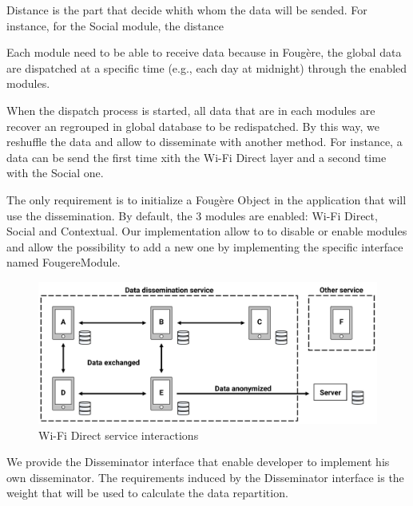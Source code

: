Distance is the part that decide whith whom the data will be sended.
For instance, for the Social module, the distance 

Each module need to be able to receive data because in Foug\`ere, the global data are dispatched at a specific time (e.g., each day at midnight) through the enabled modules.

When the dispatch process is started, all data that are in each modules are recover an regrouped in global database to be redispatched.
By this way, we reshuffle the data and allow to disseminate with another method.
For instance, a data can be send the first time xith the Wi-Fi Direct layer and a second time with the Social one.

The only requirement is to initialize a Foug\`ere Object in the application that will use the dissemination.
By default, the 3 modules are enabled: Wi-Fi Direct, Social and Contextual.
Our implementation allow to to disable or enable modules and allow the possibility to add a new one by implementing the specific interface named FougereModule.

\begin{figure}[h]
	\centering
	\includegraphics[width=\textwidth]{figures/wifidirect}
	\caption{\label{WiFiDiServInt} Wi-Fi Direct service interactions}
\end{figure}





We provide the Disseminator interface that enable developer to implement his own disseminator.
The requirements induced by the Disseminator interface is the weight that will be used to calculate the data repartition.
